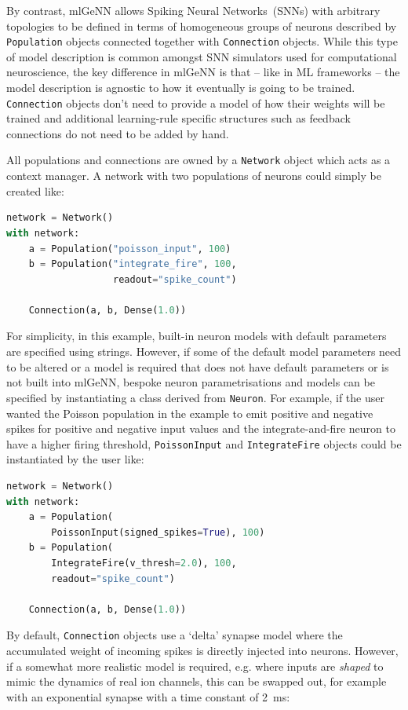 \documentclass[sigconf]{acmart}
\begin{document}
By contrast, mlGeNN allows Spiking Neural Networks~(SNNs) with arbitrary topologies to be defined in terms of homogeneous groups of neurons described by \lstinline{Population} objects connected together with \lstinline{Connection} objects.
While this type of model description is common amongst SNN simulators used for computational neuroscience, the key difference in mlGeNN is that -- like in ML frameworks -- the model description is agnostic to how it eventually is going to be trained.
\lstinline{Connection} objects don't need to provide a model of how their weights will be trained and additional learning-rule specific structures such as feedback connections do not need to be added by hand.

All populations and connections are owned by a \lstinline{Network} object which acts as a context manager.
A network with two populations of neurons could simply be created like:

\begin{lstlisting}[language=Python]
network = Network()
with network:
    a = Population("poisson_input", 100)
    b = Population("integrate_fire", 100,
                   readout="spike_count")

    Connection(a, b, Dense(1.0))
\end{lstlisting}
For simplicity, in this example, built-in neuron models with default parameters are specified using strings.
However, if some of the default model parameters need to be altered or a model is required that does not have default parameters or is not built into mlGeNN, bespoke neuron parametrisations and models can be specified by instantiating a class derived from \lstinline{Neuron}.
For example, if the user wanted the Poisson population in the example to emit positive and negative spikes for positive and negative input values and the integrate-and-fire neuron to have a higher firing threshold, \lstinline{PoissonInput} and \lstinline{IntegrateFire} objects could be instantiated by the user like:
\begin{lstlisting}[language=Python]
network = Network()
with network:
    a = Population(
        PoissonInput(signed_spikes=True), 100)
    b = Population(
        IntegrateFire(v_thresh=2.0), 100,
        readout="spike_count")

    Connection(a, b, Dense(1.0))
\end{lstlisting}
By default, \lstinline{Connection} objects use a `delta' synapse model where the accumulated weight of incoming spikes is directly injected into neurons. 
However, if a somewhat more realistic model is required, e.g. where inputs are \emph{shaped} to mimic the dynamics of real ion channels, this can be swapped out, for example with an exponential synapse with a time constant of \SI{2}{\milli\second}:
\end{document}
